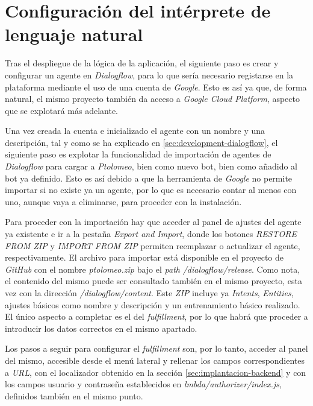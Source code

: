 \documentclass[11pt,spanish,listoffigures]{tfgetsinf}
\begin{document}
\section{Configuración del intérprete de lenguaje natural}
\label{sec:implantacion-dialogflow}

Tras el despliegue de la lógica de la aplicación, el siguiente paso es crear y configurar un agente en \textit{Dialogflow}, para lo que sería necesario registarse en la plataforma mediante el uso de una cuenta de \textit{Google}. Esto es así ya que, de forma natural, el mismo proyecto también da acceso a \textit{Google Cloud Platform}, aspecto que se explotará más adelante. 

Una vez creada la cuenta e inicializado el agente con un nombre y una descripción, tal y como se ha explicado en \ref{sec:development-dialogflow}, el siguiente paso es explotar la funcionalidad de importación de agentes de \textit{Dialogflow} para cargar a \textit{Ptolomeo}, bien como nuevo bot, bien como añadido al bot ya definido. Esto es así debido a que la herramienta de \textit{Google} no permite importar si no existe ya un agente, por lo que es necesario contar al menos con uno, aunque vaya a eliminarse, para proceder con la instalación.

Para proceder con la importación hay que acceder al panel de ajustes del agente ya existente e ir a la pestaña \textit{Export and Import}, donde los botones \textit{RESTORE FROM ZIP} y \textit{IMPORT FROM ZIP} permiten reemplazar o actualizar el agente, respectivamente. El archivo para importar está disponible en el proyecto de \textit{GitHub} con el nombre \textit{ptolomeo.zip} bajo el \textit{path} \textit{/dialogflow/release}. Como nota, el contenido del mismo puede ser consultado también en el mismo proyecto, esta vez con la dirección \textit{/dialogflow/content}. Este \textit{ZIP} incluye ya \textit{Intents}, \textit{Entities}, ajustes básicos como nombre y descripción y un entrenamiento básico realizado. El único aspecto a completar es el del \textit{fulfillment}, por lo que habrá que proceder a introducir los datos correctos en el mismo apartado.

Los pasos a seguir para configurar el \textit{fulfillment} son, por lo tanto, acceder al panel del mismo, accesible desde el menú lateral y rellenar los campos correspondientes a \textit{URL}, con el localizador obtenido en la sección \ref{sec:implantacion-backend} y con los campos usuario y contraseña establecidos en \textit{lmbda/authorizer/index.js}, definidos también en el mismo punto.
\end{document}
